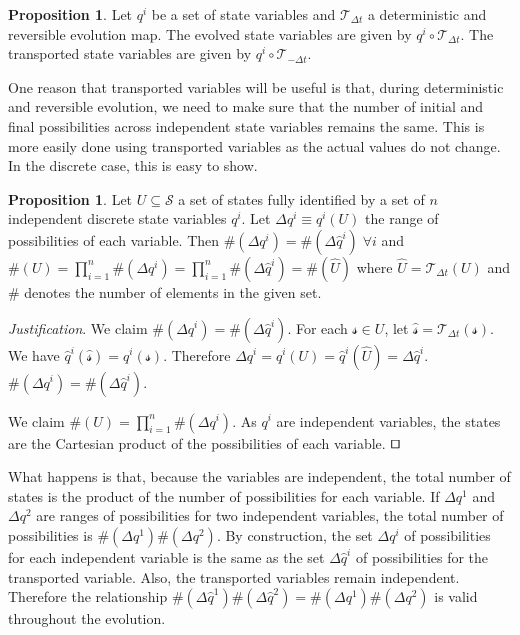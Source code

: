 \documentclass[smallextended]{svjour3}
\numberwithin{equation}{section}
\newenvironment{justification}{\emph{Justification}.}{\hfill\(\qed\)}
\theoremstyle{definition}
\newtheorem{prop}[equation]{Proposition}
\newenvironment{justification}{\emph{Justification}.}{\qed}
\begin{document}
\begin{prop}\label{prop:evolved_transported_variable}
Let $q^i$ be a set of state variables and $\mathcal{T}_{\Delta t}$ a deterministic and reversible evolution map. The evolved state variables are given by $q^i \circ \mathcal{T}_{\Delta t}$. The transported state variables are given by $q^i \circ \mathcal{T}_{-\Delta t}$.
\end{prop}

One reason that transported variables will be useful is that, during deterministic and reversible evolution, we need to make sure that the number of initial and final possibilities across independent state variables remains the same. This is more easily done using transported variables as the actual values do not change. In the discrete case, this is easy to show.

\begin{prop}\label{prop:discrete_measure}
	Let $U \subseteq \mathcal{S}$ a set of states fully identified by a set of $n$ independent discrete state variables $q^i$. Let $\Delta q^i \equiv q^i(U)$ the range of possibilities of each variable. Then $\#(\Delta q^i)=\#(\Delta \hat{q}^i) \; \forall i$ and $\#(U)=\prod\limits_{i=1}^{n}\#(\Delta q^i)=\prod\limits_{i=1}^{n}\#(\Delta \hat{q}^i)=\#(\hat{U})$ where $\hat{U}=\mathcal{T}_{\Delta t}(U)$ and $\#$ denotes the number of elements in the given set.
\end{prop}

\begin{justification}
	We claim $\#(\Delta q^i)=\#(\Delta \hat{q}^i)$. For each $\mathcal{s} \in U$, let $\hat{\mathcal{s}}=\mathcal{T}_{\Delta t}(\mathcal{s})$. We have $\hat{q}^i(\hat{\mathcal{s}}) = q^i(\mathcal{s})$. Therefore $\Delta q^i = q^i(U) = \hat{q}^i(\hat{U})=\Delta \hat{q}^i$. $\#(\Delta q^i)=\#(\Delta \hat{q}^i)$.
	
	We claim $\#(U)=\prod\limits_{i=1}^{n}\#(\Delta q^i)$. As $q^i$ are independent variables, the states are the Cartesian product of the possibilities of each variable.
\end{justification}

What happens is that, because the variables are independent, the total number of states is the product of the number of possibilities for each variable. If $\Delta q^1$ and $\Delta q^2$ are ranges of possibilities for two independent variables, the total number of possibilities is $\#(\Delta q^1) \#(\Delta q^2)$. By construction, the set $\Delta q^i$ of possibilities for each independent variable is the same as the set $\Delta \hat{q}^i$ of possibilities for the transported variable. Also, the transported variables remain independent. Therefore the relationship $\#(\Delta \hat{q}^1) \#(\Delta \hat{q}^2) = \#(\Delta q^1) \#(\Delta q^2)$ is valid throughout the evolution.
\end{document}
